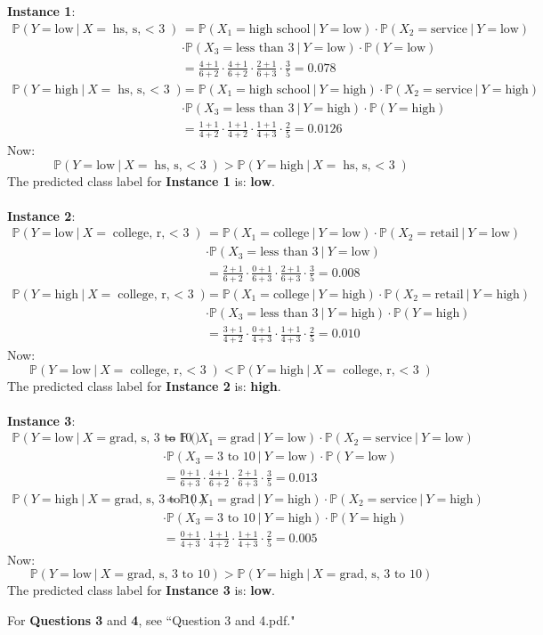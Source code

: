 \documentclass[12pt]{article}
\newcommand{\prob}[1]{\mathbb{P}(#1)}
\newcommand{\cprob}[2]{\prob{#1 ~|~ #2}}
\newcommand{\low}{\text{low}}
\newcommand{\high}{\text{high}}
\begin{document}
\textbf{Instance 1}: 
$$ \begin{aligned} \cprob{Y = \low}{X = \text{hs, s, $<$ 3}} &= \cprob{X_1 = \text{high school}}{Y = \low} \cdot \cprob{X_2 = \text{service}}{Y = \low} \\ &\cdot \cprob{X_3 = \text{less than 3}}{Y = \low} \cdot \prob{Y = \low} \\ &= \frac{4+1}{6+2} \cdot \frac{4+1}{6+2} \cdot \frac{2+1}{6+3} \cdot \frac{3}{5} = 0.078 \\
\cprob{Y = \high}{X = \text{hs, s, $<$ 3}} &= \cprob{X_1 = \text{high school}}{Y = \high} \cdot \cprob{X_2 = \text{service}}{Y = \high} \\ &\cdot \cprob{X_3 = \text{less than 3}}{Y = \high} \cdot \prob{Y = \high} \\ &= \frac{1+1}{4+2} \cdot \frac{1+1}{4+2} \cdot \frac{1+1}{4+3} \cdot \frac{2}{5} = 0.0126 \end{aligned} $$ 
Now: $$ \cprob{Y = \low}{X = \text{hs, s, $<$ 3}} > \cprob{Y = \high}{X = \text{hs, s, $<$ 3}} $$ The predicted class label for \textbf{Instance 1} is: \textbf{low}. \\~\\
\textbf{Instance 2}: 
$$ \begin{aligned} \cprob{Y = \low}{X = \text{college, r, $<$ 3}} &= \cprob{X_1 = \text{college}}{Y = \low} \cdot \cprob{X_2 = \text{retail}}{Y = \low} \\ &\cdot \cprob{X_3 = \text{less than 3}}{Y = \low} \\ &= \frac{2+1}{6+2} \cdot \frac{0+1}{6+3} \cdot \frac{2+1}{6+3} \cdot \frac{3}{5} = 0.008 \\ 
\cprob{Y = \high}{X = \text{college, r, $<$ 3}} &= \cprob{X_1 = \text{college}}{Y = \high} \cdot \cprob{X_2 = \text{retail}}{Y = \high} \\ &\cdot \cprob{X_3 = \text{less than 3}}{Y = \high} \cdot \prob{Y = \high} \\ &= \frac{3+1}{4+2} \cdot \frac{0+1}{4+3} \cdot \frac{1+1}{4+3} \cdot \frac{2}{5} = 0.010 \end{aligned} $$ 
Now: $$ \cprob{Y = \low}{X = \text{college, r, $<$ 3}} < \cprob{Y = \high}{X = \text{college, r, $<$ 3}} $$ 
The predicted class label for \textbf{Instance 2} is: \textbf{high}. \\~\\
\textbf{Instance 3}: 
$$ \begin{aligned} \cprob{Y = \low}{X = \text{grad, s, 3 to 10}} &= \cprob{X_1 = \text{grad}}{Y = \low} \cdot \cprob{X_2 = \text{service}}{Y = \low} \\ &\cdot \cprob{X_3 = \text{3 to 10}}{Y = \low} \cdot \prob{Y = \low} \\ &= \frac{0+1}{6+3} \cdot \frac{4+1}{6+2} \cdot \frac{2+1}{6+3} \cdot \frac{3}{5} = 0.013 \\ 
\cprob{Y = \high}{X = \text{grad, s, 3 to 10}} &= \cprob{X_1 = \text{grad}}{Y = \high} \cdot \cprob{X_2 = \text{service}}{Y = \high} \\ &\cdot \cprob{X_3 = \text{3 to 10}}{Y = \high} \cdot \prob{Y = \high} \\ &= \frac{0+1}{4+3} \cdot \frac{1+1}{4+2} \cdot \frac{1+1}{4+3} \cdot \frac{2}{5} = 0.005 \end{aligned} $$ 
Now: $$ \cprob{Y = \low}{X = \text{grad, s, 3 to 10}} > \cprob{Y = \high}{X = \text{grad, s, 3 to 10}} $$ 
The predicted class label for \textbf{Instance 3} is: \textbf{low}. 

For \textbf{Questions 3} and \textbf{4}, see ``Question 3 and 4.pdf." 
\end{document}
